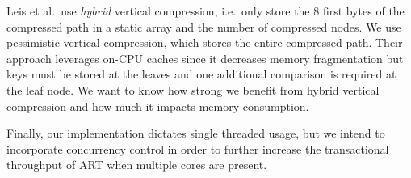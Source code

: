 \documentclass[abstracton,12pt]{scrartcl}
\theoremstyle{definition}
\begin{document}
Leis et al.\ use \textit{hybrid} vertical compression, i.e.\ only store the
8 first bytes of the compressed path in a static array and the number of
compressed nodes. We use pessimistic vertical compression, which stores
the entire compressed path.
Their approach leverages on-CPU caches since it decreases memory fragmentation
but keys must be stored at the leaves and one additional comparison is
required at the leaf node. We want to know how strong we benefit from hybrid 
vertical compression and how much it impacts memory consumption.

Finally, our implementation dictates single threaded usage, but we intend to
incorporate concurrency control in order to further increase the transactional
throughput of ART when multiple cores are present.

\newpage



\end{document}

